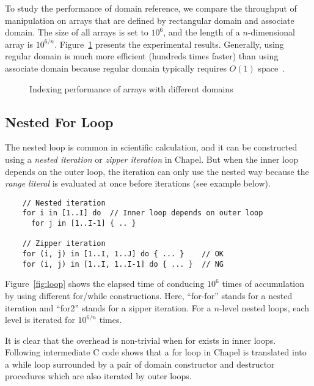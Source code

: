 To study the performance of domain reference, we compare the throughput of
manipulation on arrays that are defined by rectangular domain and associate
domain. The size of all arrays is set to $10^6$, and the length of a
$n$-dimensional array is $10^{6/n}$. Figure~\ref{fig:array} presents the
experimental results. Generally, using regular domain is much more efficient
(hundreds times faster) than using associate domain because regular domain
typically requires $O(1)$ space~\cite{chapelspec}.
\begin{figure}[t]
\centering

\caption{Indexing performance of arrays with different domains}
\label{fig:array}
\end{figure}

\subsection{Nested For Loop}\label{sec:nested_loop}
The nested loop is common in scientific calculation, and it can be constructed
using a {\em nested iteration} or {\em zipper iteration} in Chapel. But when the
inner loop depends on the outer loop, the iteration can only use the nested way
because the {\em range literal} is evaluated at once before iterations (see
example below).
\begin{lstlisting}
    // Nested iteration
    for i in [1..I] do  // Inner loop depends on outer loop
      for j in [1..I-1] { .. } 

    // Zipper iteration
    for (i, j) in [1..I, 1..J] do { ... }    // OK
    for (i, j) in [1..I, 1..I-1] do { ... }  // NG
\end{lstlisting}

Figure~\ref{fig:loop} shows the elapsed time of conducing $10^6$ times of
accumulation by using different {\ic for}/{\ic while} constructions. Here,
``{\ic for-for}'' stands for a nested iteration and ``{\ic for2}'' stands for a
zipper iteration. For a $n$-level nested loops, each level is iterated for
$10^{6/n}$ times.
\begin{figure*}[t]
\centering

\caption{Performance comparison of traversing various nested loops}
\label{fig:loop}
\end{figure*}

It is clear that the overhead is non-trivial when {\ic for} exists in inner
loops. Following intermediate C code shows that a {\ic for} loop in Chapel is
translated into a {\ic while} loop surrounded by a pair of domain constructor
and destructor procedures which are also iterated by outer loops.

